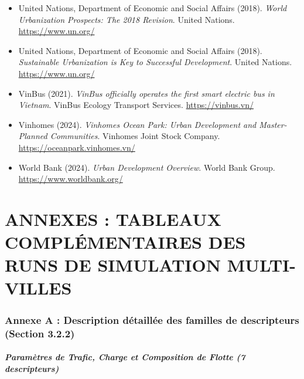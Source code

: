 \documentclass[10pt, a4paper]{article}
\begin{document}
\begin{itemize}
\item
  United Nations, Department of Economic and Social Affairs (2018).
  \emph{World Urbanization Prospects: The 2018 Revision}. United
  Nations. \url{https://www.un.org/}
\item
  United Nations, Department of Economic and Social Affairs (2018).
  \emph{Sustainable Urbanization is Key to Successful Development}.
  United Nations. \url{https://www.un.org/}
\item
  VinBus (2021). \emph{VinBus officially operates the first smart
  electric bus in Vietnam}. VinBus Ecology Transport Services.
  \url{https://vinbus.vn/}
\item
  Vinhomes (2024). \emph{Vinhomes Ocean Park: Urban Development and
  Master-Planned Communities}. Vinhomes Joint Stock Company.
  \url{https://oceanpark.vinhomes.vn/}
\item
  World Bank (2024). \emph{Urban Development Overview}. World Bank
  Group. \url{https://www.worldbank.org/}
\end{itemize}

\newpage

\section{ANNEXES : TABLEAUX COMPLÉMENTAIRES DES RUNS DE SIMULATION
MULTI-VILLES}\label{annexes-tableaux-compluxe9mentaires-des-runs-de-simulation-multi-villes}

\subsubsection{Annexe A : Description détaillée des familles de
descripteurs (Section
3.2.2)}\label{annexe-a-description-duxe9tailluxe9e-des-familles-de-descripteurs-section-3.2.2}

\subparagraph{Paramètres de Trafic, Charge et Composition de Flotte (7
descripteurs)}\label{paramuxe8tres-de-trafic-charge-et-composition-de-flotte-7-descripteurs}
\end{document}
